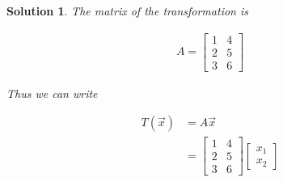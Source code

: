 \documentclass{article}
\newtheorem*{solution}{Solution}
\begin{document}
\begin{solution}
The matrix of the transformation is 

\begin{align*}
A = \begin{bmatrix} 1 & 4 \\ 2 & 5 \\ 3 & 6 \end{bmatrix}
\end{align*}

Thus we can write

\begin{align*}
T(\vec{x}) &= A\vec{x} \\
&= \begin{bmatrix} 1 & 4 \\ 2 & 5 \\ 3 & 6 \end{bmatrix} \begin{bmatrix} x_{1} \\ x_{2} \end{bmatrix}
\end{align*}
\end{solution}
\end{document}
